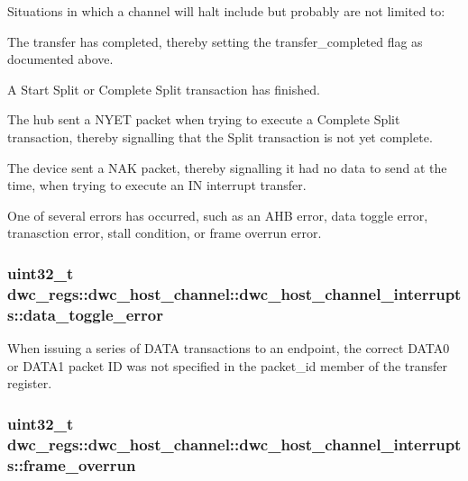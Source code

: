 Situations in which a channel will halt include but probably are not limited to\-:


\begin{DoxyItemize}
\item The transfer has completed, thereby setting the transfer\-\_\-completed flag as documented above.
\item A Start Split or Complete Split transaction has finished.
\item The hub sent a N\-Y\-E\-T packet when trying to execute a Complete Split transaction, thereby signalling that the Split transaction is not yet complete.
\item The device sent a N\-A\-K packet, thereby signalling it had no data to send at the time, when trying to execute an I\-N interrupt transfer.
\item One of several errors has occurred, such as an A\-H\-B error, data toggle error, tranasction error, stall condition, or frame overrun error. 
\end{DoxyItemize}\hypertarget{uniondwc__regs_1_1dwc__host__channel_1_1dwc__host__channel__interrupts_a337ecfce39c6226d51404c5c7b14b5ab}{
\subsubsection[{data\-\_\-toggle\-\_\-error}]{\setlength{\rightskip}{0pt plus 5cm}uint32\-\_\-t dwc\-\_\-regs\-::dwc\-\_\-host\-\_\-channel\-::dwc\-\_\-host\-\_\-channel\-\_\-interrupts\-::data\-\_\-toggle\-\_\-error}}\label{uniondwc__regs_1_1dwc__host__channel_1_1dwc__host__channel__interrupts_a337ecfce39c6226d51404c5c7b14b5ab}
When issuing a series of D\-A\-T\-A transactions to an endpoint, the correct D\-A\-T\-A0 or D\-A\-T\-A1 packet I\-D was not specified in the packet\-\_\-id member of the transfer register. \hypertarget{uniondwc__regs_1_1dwc__host__channel_1_1dwc__host__channel__interrupts_acfa88ef39b0d5b954721d5bda7026a6c}{
\subsubsection[{frame\-\_\-overrun}]{\setlength{\rightskip}{0pt plus 5cm}uint32\-\_\-t dwc\-\_\-regs\-::dwc\-\_\-host\-\_\-channel\-::dwc\-\_\-host\-\_\-channel\-\_\-interrupts\-::frame\-\_\-overrun}}\label{uniondwc__regs_1_1dwc__host__channel_1_1dwc__host__channel__interrupts_acfa88ef39b0d5b954721d5bda7026a6c}

